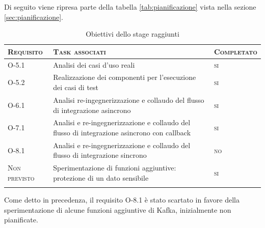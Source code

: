 \noindent
Di seguito viene ripresa parte della tabella \ref{tab:pianificazione} vista nella sezione \ref{sec:pianificazione}.

\onehalfspacing
\begin{small}
  \begin{center}
    \centering
    \renewcommand\arraystretch{1.6}
    \begin{longtable}{| >{\centering\arraybackslash}m{2cm}|m{9.5cm}|>{\centering\arraybackslash}m{2.2cm}|}
      \hline
      \textsc{\textbf{Requisito}} & \textsc{\textbf{Task associati}} & \textsc{\textbf{Completato}} \\
      \hline
      O-5.1 & Analisi dei casi d'uso reali & \textsc{si} \\
      \hline
      O-5.2 & Realizzazione dei componenti per l'esecuzione dei casi di test & \textsc{si}\\
      \Xhline{2\arrayrulewidth}
      O-6.1 & Analisi re-ingegnerizzazione e collaudo del flusso di integrazione asincrono & \textsc{si} \\
      \Xhline{2\arrayrulewidth}
      O-7.1 & Analisi e re-ingegnerizzazione e collaudo del flusso di integrazione asincrono con callback & \textsc{si}\\
      \Xhline{2\arrayrulewidth}
      O-8.1 & Analisi e re-ingegnerizzazione e collaudo del flusso di integrazione sincrono & \textsc{no}\\
      \hline
      \textsc{Non previsto} & Sperimentazione di funzioni aggiuntive: protezione di un dato sensibile & \textsc{si}\\
      \hline

      \caption{Obiettivi dello stage raggiunti}
    \end{longtable}
  \end{center}
\end{small}

Come detto in precedenza, il requisito O-8.1 è stato scartato in favore della sperimentazione di alcune funzioni aggiuntive di Kafka, inizialmente non pianificate.

%
%

